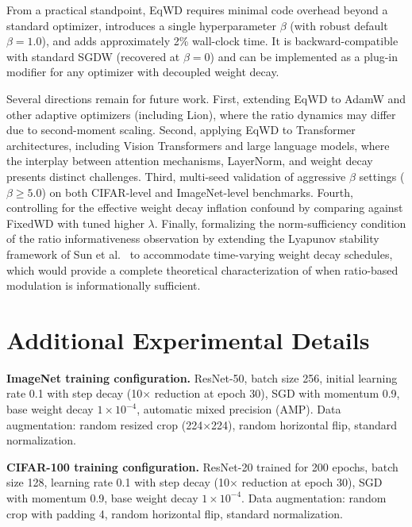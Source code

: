 \documentclass{article}
\begin{document}
From a practical standpoint, EqWD requires minimal code overhead beyond
a standard optimizer, introduces a single hyperparameter $\beta$ (with
robust default $\beta = 1.0$), and adds approximately 2\% wall-clock
time. It is backward-compatible with standard SGDW (recovered at
$\beta = 0$) and can be implemented as a plug-in modifier for any
optimizer with decoupled weight decay.

Several directions remain for future work. First, extending EqWD to
AdamW and other adaptive optimizers (including Lion), where the ratio
dynamics may differ due to second-moment scaling. Second, applying EqWD
to Transformer architectures, including Vision Transformers and large
language models, where the interplay between attention mechanisms,
LayerNorm, and weight decay presents distinct challenges. Third, multi-seed validation of
aggressive $\beta$ settings ($\beta \geq 5.0$) on both CIFAR-level
and ImageNet-level benchmarks. Fourth, controlling for the effective
weight decay inflation confound by comparing against FixedWD with tuned
higher $\lambda$. Finally, formalizing the norm-sufficiency condition
of the ratio informativeness observation by extending the Lyapunov stability framework of Sun et
al.~\citep{sun2025cvpr} to accommodate time-varying weight decay
schedules, which would provide a complete theoretical characterization
of when ratio-based modulation is informationally sufficient.






\appendix

\section{Additional Experimental Details}
\label{app:details}

\textbf{ImageNet training configuration.} ResNet-50, batch size 256, initial learning rate 0.1 with step decay (10$\times$ reduction at epoch 30), SGD with momentum 0.9, base weight decay $1 \times 10^{-4}$, automatic mixed precision (AMP). Data augmentation: random resized crop (224$\times$224), random horizontal flip, standard normalization.

\textbf{CIFAR-100 training configuration.} ResNet-20 trained for 200 epochs, batch size 128, learning rate 0.1 with step decay (10$\times$ reduction at epoch 30), SGD with momentum 0.9, base weight decay $1 \times 10^{-4}$. Data augmentation: random crop with padding 4, random horizontal flip, standard normalization.
\end{document}
